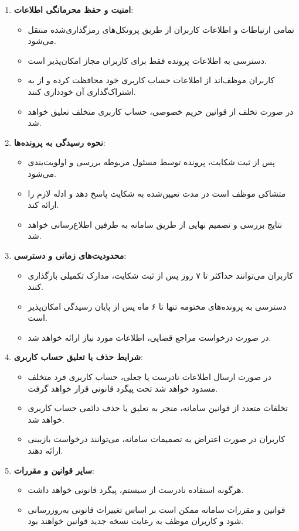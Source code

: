 \documentclass[12pt,a4paper,oneside]{article}
\begin{document}
\begin{enumerate}
    \item \textbf{امنیت و حفظ محرمانگی اطلاعات}:
    \begin{itemize}
        \item تمامی ارتباطات و اطلاعات کاربران از طریق پروتکل‌های رمزگذاری‌شده منتقل می‌شود.
        \item دسترسی به اطلاعات پرونده فقط برای کاربران مجاز امکان‌پذیر است.
        \item کاربران موظف‌اند از اطلاعات حساب کاربری خود محافظت کرده و از به اشتراک‌گذاری آن خودداری کنند.
        \item در صورت تخلف از قوانین حریم خصوصی، حساب کاربری متخلف تعلیق خواهد شد.
    \end{itemize}

    \item \textbf{نحوه رسیدگی به پرونده‌ها}:
    \begin{itemize}
        \item پس از ثبت شکایت، پرونده توسط مسئول مربوطه بررسی و اولویت‌بندی می‌شود.
        \item متشاکی موظف است در مدت تعیین‌شده به شکایت پاسخ دهد و ادله لازم را ارائه کند.
        \item نتایج بررسی و تصمیم نهایی از طریق سامانه به طرفین اطلاع‌رسانی خواهد شد.
    \end{itemize}

    \item \textbf{محدودیت‌های زمانی و دسترسی}:
    \begin{itemize}
        \item کاربران می‌توانند حداکثر تا ۷ روز پس از ثبت شکایت، مدارک تکمیلی بارگذاری کنند.
        \item دسترسی به پرونده‌های مختومه تنها تا ۶ ماه پس از پایان رسیدگی امکان‌پذیر است.
        \item در صورت درخواست مراجع قضایی، اطلاعات مورد نیاز ارائه خواهد شد.
    \end{itemize}

    \item \textbf{شرایط حذف یا تعلیق حساب کاربری}:
    \begin{itemize}
        \item در صورت ارسال اطلاعات نادرست یا جعلی، حساب کاربری فرد متخلف مسدود خواهد شد تحت پیگرد قانونی قرار خواهد گرفت.
        \item تخلفات متعدد از قوانین سامانه، منجر به تعلیق یا حذف دائمی حساب کاربری خواهد شد.
        \item کاربران در صورت اعتراض به تصمیمات سامانه، می‌توانند درخواست بازبینی ارائه دهند.
    \end{itemize}

    \item \textbf{سایر قوانین و مقررات}:
    \begin{itemize}
        \item هرگونه استفاده نادرست از سیستم، پیگرد قانونی خواهد داشت.
        \item قوانین و مقررات سامانه ممکن است بر اساس تغییرات قانونی به‌روزرسانی شود و کاربران موظف به رعایت نسخه جدید قوانین خواهند بود.
    \end{itemize}
\end{enumerate}
\end{document}

